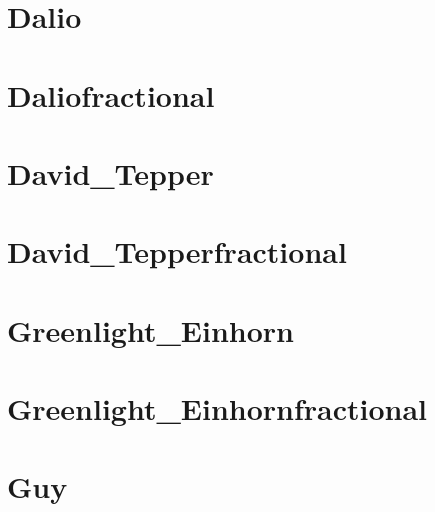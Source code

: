 \documentclass[letterpaper,10pt,english]{sphinxmanual}
\begin{document}
\chapter{Dalio}
\label{\detokenize{Dalio2021-09-30:dalio}}\label{\detokenize{Dalio2021-09-30::doc}}
\noindent{}


\chapter{Daliofractional}
\label{\detokenize{Daliofractional2021-09-30:daliofractional}}\label{\detokenize{Daliofractional2021-09-30::doc}}
\noindent{}


\chapter{David\_Tepper}
\label{\detokenize{David_Tepper2021-09-30:david-tepper}}\label{\detokenize{David_Tepper2021-09-30::doc}}
\noindent{}


\chapter{David\_Tepperfractional}
\label{\detokenize{David_Tepperfractional2021-09-30:david-tepperfractional}}\label{\detokenize{David_Tepperfractional2021-09-30::doc}}
\noindent{}


\chapter{Greenlight\_Einhorn}
\label{\detokenize{Greenlight_Einhorn2021-09-30:greenlight-einhorn}}\label{\detokenize{Greenlight_Einhorn2021-09-30::doc}}
\noindent{}


\chapter{Greenlight\_Einhornfractional}
\label{\detokenize{Greenlight_Einhornfractional2021-09-30:greenlight-einhornfractional}}\label{\detokenize{Greenlight_Einhornfractional2021-09-30::doc}}
\noindent{}


\chapter{Guy}
\label{\detokenize{Guy2021-09-30:guy}}\label{\detokenize{Guy2021-09-30::doc}}
\noindent{}
\end{document}
